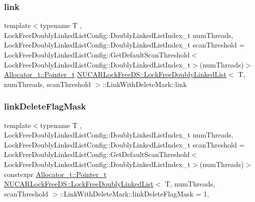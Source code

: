 \subsubsection{\texorpdfstring{link}{link}}
{\footnotesize\ttfamily template$<$typename T , Lock\+Free\+Doubly\+Linked\+List\+Config\+::\+Doubly\+Linked\+List\+Index\+\_\+t num\+Threads, Lock\+Free\+Doubly\+Linked\+List\+Config\+::\+Doubly\+Linked\+List\+Index\+\_\+t scan\+Threshold = Lock\+Free\+Doubly\+Linked\+List\+Config\+::\+Get\+Default\+Scan\+Threshold$<$\+Lock\+Free\+Doubly\+Linked\+List\+Config\+::\+Doubly\+Linked\+List\+Index\+\_\+t$>$(num\+Threads)$>$ \\
\mbox{\hyperlink{class_n_u_c_a_r_lock_free_d_s_1_1_allocator_a3931e84d06ddd3b436103475197eb12a}{Allocator\+\_\+t\+::\+Pointer\+\_\+t}} \mbox{\hyperlink{class_n_u_c_a_r_lock_free_d_s_1_1_lock_free_doubly_linked_list}{N\+U\+C\+A\+R\+Lock\+Free\+D\+S\+::\+Lock\+Free\+Doubly\+Linked\+List}}$<$ T, num\+Threads, scan\+Threshold $>$\+::Link\+With\+Delete\+Mark\+::link\hspace{0.3cm}{\ttfamily [private]}}

\mbox{\label{class_n_u_c_a_r_lock_free_d_s_1_1_lock_free_doubly_linked_list_1_1_link_with_delete_mark_af670d4e1c35ee581cbc55ec70e1de6c4}} 
\subsubsection{\texorpdfstring{link\+Delete\+Flag\+Mask}{linkDeleteFlagMask}}
{\footnotesize\ttfamily template$<$typename T , Lock\+Free\+Doubly\+Linked\+List\+Config\+::\+Doubly\+Linked\+List\+Index\+\_\+t num\+Threads, Lock\+Free\+Doubly\+Linked\+List\+Config\+::\+Doubly\+Linked\+List\+Index\+\_\+t scan\+Threshold = Lock\+Free\+Doubly\+Linked\+List\+Config\+::\+Get\+Default\+Scan\+Threshold$<$\+Lock\+Free\+Doubly\+Linked\+List\+Config\+::\+Doubly\+Linked\+List\+Index\+\_\+t$>$(num\+Threads)$>$ \\
constexpr \mbox{\hyperlink{class_n_u_c_a_r_lock_free_d_s_1_1_allocator_a3931e84d06ddd3b436103475197eb12a}{Allocator\+\_\+t\+::\+Pointer\+\_\+t}} \mbox{\hyperlink{class_n_u_c_a_r_lock_free_d_s_1_1_lock_free_doubly_linked_list}{N\+U\+C\+A\+R\+Lock\+Free\+D\+S\+::\+Lock\+Free\+Doubly\+Linked\+List}}$<$ T, num\+Threads, scan\+Threshold $>$\+::Link\+With\+Delete\+Mark\+::link\+Delete\+Flag\+Mask = 1\hspace{0.3cm}{\ttfamily [static]}, {\ttfamily [private]}}

